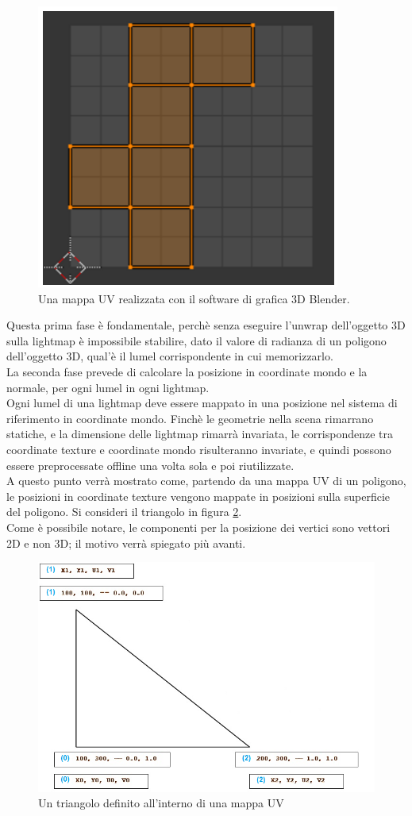 \newpage
\begin{figure}[htb]
 \centering
 \includegraphics[width=0.5\linewidth]{images/chapter_stato_arte/stato_arte_uvmap_blender.png}\hfill
 \caption[Mappa UV realizzata in Blender]{Una mappa UV realizzata con il software di grafica 3D Blender.}
 \label{fig:stato_arte_uvmap_blender}
\end{figure}
Questa prima fase è fondamentale, perchè senza eseguire l’unwrap dell’oggetto 3D sulla lightmap è impossibile stabilire, dato il valore di radianza di un poligono dell’oggetto 3D, qual’è il lumel corrispondente in cui memorizzarlo.
\\
La seconda fase prevede di calcolare la posizione in coordinate mondo e la normale, per ogni lumel in ogni lightmap.
\\
Ogni lumel di una lightmap deve essere mappato in una posizione nel sistema di riferimento in coordinate mondo. Finchè le geometrie nella scena rimarrano statiche, e la dimensione delle lightmap rimarrà invariata, le corrispondenze tra coordinate texture e coordinate mondo risulteranno invariate, e quindi possono essere preprocessate offline una volta sola e poi riutilizzate.
\\
A questo punto verrà mostrato come, partendo da una mappa UV di un poligono, le posizioni in coordinate texture vengono mappate in posizioni sulla superficie del poligono.
Si consideri il triangolo in figura \ref{fig:stato_arte_ligh_triangle1}.
\\
Come è possibile notare, le componenti per la posizione dei vertici sono vettori 2D e non 3D; il motivo verrà spiegato più avanti.
\newpage
\begin{figure}[htb]
 \centering
 \includegraphics[width=0.7\linewidth]{images/chapter_stato_arte/stato_arte_ligh_triangle1.png}\hfill
 \caption[Triangolo di esempio per mapping UV]{Un triangolo definito all'interno di una mappa UV}
 \label{fig:stato_arte_ligh_triangle1}
\end{figure}
